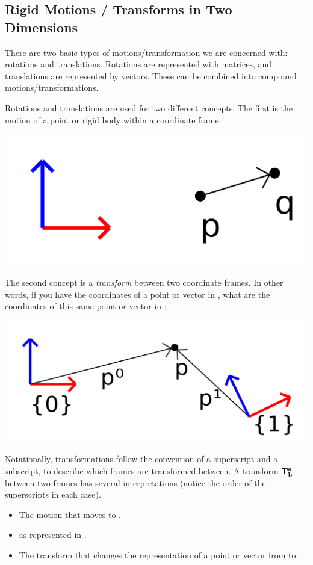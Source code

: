 \documentclass{16384_doc}
\begin{document}
\subsection{Rigid Motions / Transforms in Two Dimensions}

There are two basic types of motions/transformation we are concerned with:
rotations and translations. Rotations are represented with matrices, and
translations are represented by vectors.  These can be combined into compound
motions/transformations.

Rotations and translations are used for two different concepts.  The first is
the motion of a point or rigid body within a coordinate frame:

\begin{center}
\includegraphics[scale=0.1]{generated_figures/bg_motion.png}
\end{center}

The second concept is a \emph{transform} between two coordinate frames. In
other words, if you have the coordinates of a point or vector in , what
are the coordinates of this same point or vector in :

\begin{center}
\includegraphics[scale=0.1]{generated_figures/bg_transform.png}
\end{center}

Notationally, transformations follow the convention of a superscript and a
subscript, to describe which frames are transformed between. A transform
$\mathbf{T_{b}^{a}}$ between two frames has several interpretations (notice
the order of the superscripts in each case).
\begin{itemize}
  \item The motion that moves  to .
  \item {} as represented in .
  \item The transform that changes the representation of a point or vector from
     to .
\end{itemize}
\end{document}
